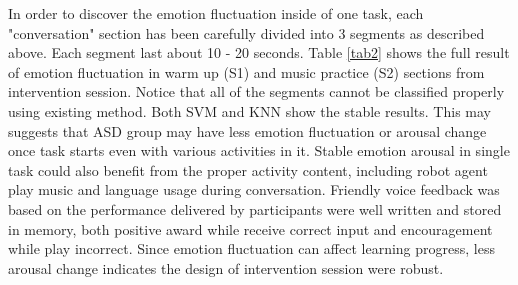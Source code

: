 \documentclass[conference]{IEEEtran}
\begin{document}
In order to discover the emotion fluctuation inside of one task, each "conversation" section
has been carefully divided into 3 segments as described above. Each segment last about 10 - 20 seconds.
Table \ref{tab2} shows the full result of
emotion fluctuation in warm up (S1) and music practice (S2) sections from intervention session. Notice that
all of the segments cannot be classified properly using existing method. Both SVM and KNN show
the stable results. This may suggests that ASD group may have less emotion fluctuation or arousal
change once task starts even with various activities in it. Stable emotion arousal in single task
could also benefit from the proper activity content, including robot agent play music and language
usage during conversation. Friendly voice feedback was based on the performance delivered by participants
were well written and stored in memory, both positive award while receive correct input and encouragement
while play incorrect. Since emotion fluctuation can affect learning progress, less arousal change 
indicates the design of intervention session were robust. 
\end{document}
